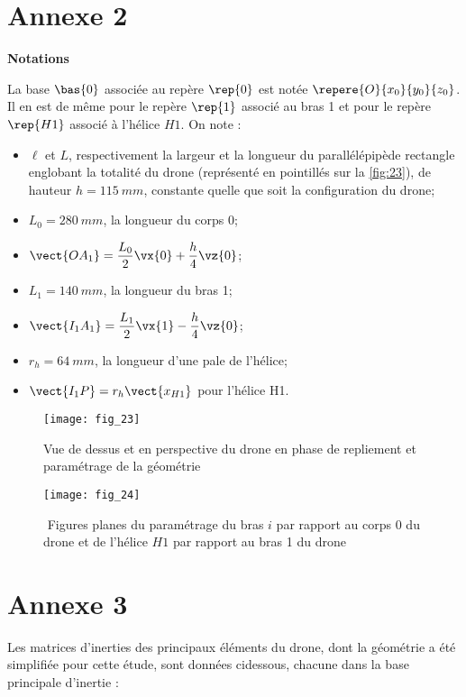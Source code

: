 
\newpage

\section*{Annexe 2}
\textbf{Notations}

La base $\bas{0}$ associée au repère $\rep{0}$ est notée $\repere{O}{x_0}{y_0}{z_0}$. Il en est de même pour le repère $\rep{1}$ associé au bras 1 et pour le repère $\rep{H1}$ associé à l’hélice $H1$. On note :
\begin{itemize}
\item $\ell$ et $L$, respectivement la largeur et la longueur du parallélépipède rectangle englobant
la totalité du drone (représenté en pointillés sur la \autoref{fig:23}), de hauteur $h = \SI{115}{mm}$,
constante quelle que soit la configuration du drone;
\item $L_0 = \SI{280}{mm}$, la longueur du corps 0;
\item $\vect{­OA_1} = \dfrac{L_0}{2} \vx{0} + \dfrac{h}{4}\vz{0}$;
\item $L_1 = \SI{140}{mm}$, la longueur du bras 1;
\item $\vect{I_1A_1} = \dfrac{L_1}{2} \vx{1} - \dfrac{h}{4} \vz{0}$;
\item $r_h = \SI{64}{mm}$, la longueur d’une pale de l’hélice;
\item $\vect{I_1 P} = r_h \vect{x_{H1}}$ pour l’hélice H1.
\end{itemize}

\begin{figure}[H]
\centering
\texttt{[image: fig\_23]}
\caption{\label{fig:23}  Vue de dessus et en perspective du drone en phase de repliement et paramétrage de la géométrie}
\end{figure}


\begin{figure}[H]
\centering
\texttt{[image: fig\_24]}
\caption{\label{fig:24} ­ Figures planes du paramétrage du bras $i$ par rapport au corps 0 du drone et de
l’hélice $H1$ par rapport au bras 1 du drone}
\end{figure}



\section*{Annexe 3}

Les matrices d’inerties des principaux éléments du drone, dont la géométrie a été simplifiée
pour cette étude, sont données ci­dessous, chacune dans la base principale d’inertie :


